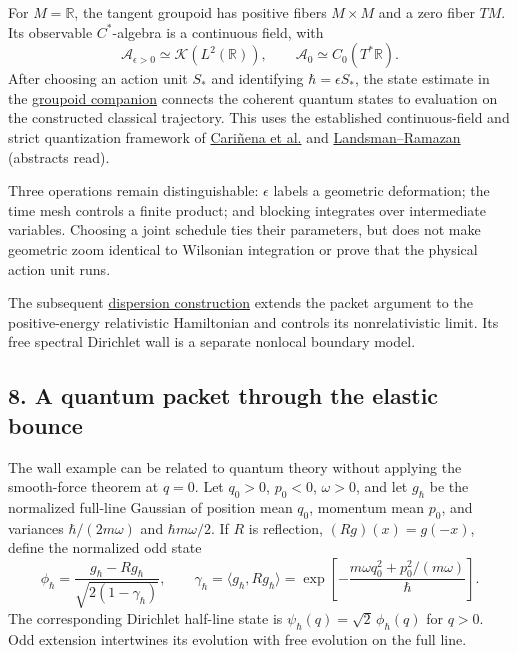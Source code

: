 \documentclass[11pt,a4paper]{article}
\begin{document}
For \(M=\mathbb R\), the tangent groupoid has positive fibers
\(M\times M\) and a zero fiber \(TM\). Its observable \(C^*\)-algebra is
a continuous field, with \[
 \mathcal A_{\epsilon>0}\simeq\mathcal K(L^2(\mathbb R)),\qquad
 \mathcal A_0\simeq C_0(T^*\mathbb R).\tag{19}
\] After choosing an action unit \(S_*\) and identifying
\(\hbar=\epsilon S_*\), the state estimate in the
\href{groupoid-quantum-newton-states.md}{groupoid companion} connects
the coherent quantum states to evaluation on the constructed classical
trajectory. This uses the established continuous-field and strict
quantization framework of
\href{https://arxiv.org/abs/math/9802102}{Cariñena et al.} and
\href{https://arxiv.org/abs/math-ph/0001005}{Landsman--Ramazan}
(abstracts read).

Three operations remain distinguishable: \(\epsilon\) labels a geometric
deformation; the time mesh controls a finite product; and blocking
integrates over intermediate variables. Choosing a joint schedule ties
their parameters, but does not make geometric zoom identical to
Wilsonian integration or prove that the physical action unit runs.

The subsequent \href{relativistic-dispersion-blocks.md}{dispersion
construction} extends the packet argument to the positive-energy
relativistic Hamiltonian and controls its nonrelativistic limit. Its
free spectral Dirichlet wall is a separate nonlocal boundary model.

\hypertarget{a-quantum-packet-through-the-elastic-bounce}{%
\subsection{8. A quantum packet through the elastic
bounce}\label{a-quantum-packet-through-the-elastic-bounce}}

The wall example can be related to quantum theory without applying the
smooth-force theorem at \(q=0\). Let \(q_0>0\), \(p_0<0\), \(\omega>0\),
and let \(g_\hbar\) be the normalized full-line Gaussian of position
mean \(q_0\), momentum mean \(p_0\), and variances \(\hbar/(2m\omega)\)
and \(\hbar m\omega/2\). If \(R\) is reflection, \((Rg)(x)=g(-x)\),
define the normalized odd state
\[\phi_\hbar=\frac{g_\hbar-Rg_\hbar}{\sqrt{2(1-\gamma_\hbar)}},
 \qquad
 \gamma_\hbar=\langle g_\hbar,Rg_\hbar\rangle
 =\exp\left[-\frac{m\omega q_0^2+p_0^2/(m\omega)}{\hbar}\right].
 \tag{20}
\] The corresponding Dirichlet half-line state is
\(\psi_\hbar(q)=\sqrt2\,\phi_\hbar(q)\) for \(q>0\). Odd extension
intertwines its evolution with free evolution on the full line.
\end{document}
